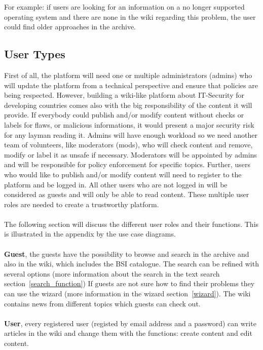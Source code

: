 For example: if users are looking for an information on a no longer supported operating system and there are none in the wiki regarding this problem, the user could find older approaches in the archive. 


\subsection{User Types} 
\label{user_types}

First of all, the platform will need one or multiple administrators (admins) who will update the platform from a technical perspective and ensure that policies are being respected. 
However, building a wiki-like platform about IT-Security for developing countries comes also with the big responsibility of the content it will provide. 
If everybody could publish and/or modify content without checks or labels for flaws, or malicious informations, it would present a major security risk for any layman reading it. 
Admins will have enough workload so we need another team of volunteers, like moderators (mods), who will check content and remove, modify or label it as unsafe if necessary. 
Moderators will be appointed by admins and will be responsible for policy enforcement for specific topics. 
Further, users who would like to publish and/or modify content will need to register to the platform and be logged in. 
All other users who are not logged in will be considered as guests and will only be able to read content. 
These multiple user roles are needed to create a trustworthy platform. 
\\\\
The following section will discuss the different user roles and their functions. 
This is illustrated in the appendix by the use case diagrams. 
\\\\
\textbf{Guest}, the guests have the possibility to browse and search in the archive and also in the wiki, which includes the BSI catalogue. The search can be refined with several options (more information about the search in the text search section~\ref{search_function}) 
If guests are not sure how to find their problems they can use the wizard (more information in the wizard section~\ref{wizard}). 
The wiki contains news from different topics which guests can check out.
\\\\
\textbf{User}, every registered user (registed by email address and a password) can write articles in the wiki and change them with the functions: create content and edit content. 
